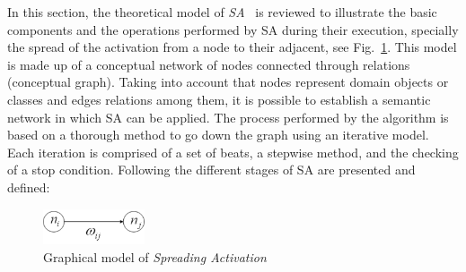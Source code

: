 In this section, the theoretical model of \textit{SA}~\cite{Collins_Loftus_1975,AndersonTheory} is reviewed to 
illustrate the basic components and the operations performed by SA during their execution, specially
the spread of the activation from a node to their adjacent, see Fig.~\ref{fig:spreading}. 
This model is made up of a conceptual network of nodes connected through relations (conceptual graph). 
Taking into account that nodes represent domain objects or classes and edges relations among them, 
it is possible to establish a semantic network in which SA can be applied. The process performed by the algorithm 
is based on a thorough method to go down the graph using an iterative model. Each iteration is comprised of 
a set of beats, a stepwise method, and the checking of a stop condition. 
Following the different stages of SA are presented and defined:

\begin{figure}[h]
 \centering
    \includegraphics[width=3cm]{images/spreading}
    \caption{Graphical model of \textit{Spreading Activation}}
 \label{fig:spreading}
\end{figure}

